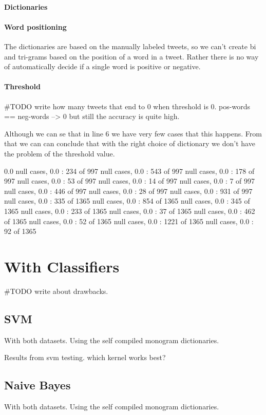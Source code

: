 \paragraph{Dictionaries}
\paragraph{Word positioning}
The dictionaries are based on the manually labeled
tweets, so we can't create bi and tri-grams based on the position of a word in a tweet.
Rather there is no way of automatically decide if a single word is positive or
negative. 

\paragraph{Threshold}
#TODO write how many tweets that end to 0 when threshold is 0.
pos-words == neg-words --> 0 but still the accuracy is quite high.

Although we can se that in line 6 we have very few cases that this happens.
From that we can can conclude that with the right choice of dictionary we don't
have the problem of the threshold value. 

0.0
null cases, 0.0 : 234 of 997
null cases, 0.0 : 543 of 997
null cases, 0.0 : 178 of 997
null cases, 0.0 : 53 of 997
null cases, 0.0 : 14 of 997
null cases, 0.0 : 7 of 997
null cases, 0.0 : 446 of 997
null cases, 0.0 : 28 of 997
null cases, 0.0 : 931 of 997
null cases, 0.0 : 335 of 1365
null cases, 0.0 : 854 of 1365
null cases, 0.0 : 345 of 1365
null cases, 0.0 : 233 of 1365
null cases, 0.0 : 37 of 1365
null cases, 0.0 : 462 of 1365
null cases, 0.0 : 52 of 1365
null cases, 0.0 : 1221 of 1365
null cases, 0.0 : 92 of 1365

\section{With Classifiers}

#TODO write about drawbacks. 

\subsection{SVM}
With both datasets.
Using the self compiled monogram dictionaries. 

Results from svm testing. which kernel works best?

\subsection{Naive Bayes}
With both datasets.
Using the self compiled monogram dictionaries. 

